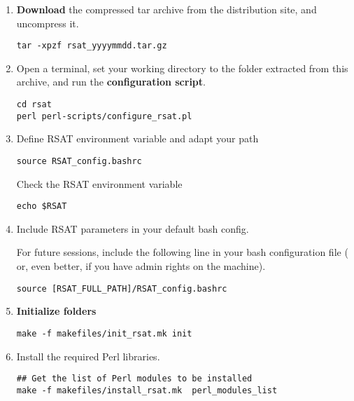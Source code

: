 \documentclass[12pt,a4paper, oneside]{scrreprt} %
\begin{document}
\begin{enumerate}
\item \textbf{Download} the compressed tar archive from the \RSAT
  distribution site, and uncompress it.

  \begin{lstlisting}
tar -xpzf rsat_yyyymmdd.tar.gz
  \end{lstlisting}
  
  
\item Open a terminal, set your working directory to the folder
   extracted from this archive, and run the \RSAT
  \textbf{configuration script}.

  \begin{lstlisting}
cd rsat
perl perl-scripts/configure_rsat.pl
  \end{lstlisting}

\item Define RSAT environment variable and adapt your path

  \begin{lstlisting}
source RSAT_config.bashrc
  \end{lstlisting}


Check the RSAT environment variable

  \begin{lstlisting}
echo $RSAT
  \end{lstlisting}

\item Include RSAT parameters in your default bash config.

For future sessions, include the following line in your bash
configuration file ( or, even better,
 if you have admin rights on the machine).

\begin{verbatim}
source [RSAT_FULL_PATH]/RSAT_config.bashrc
\end{verbatim}


\item \textbf{Initialize \RSAT folders}

  \begin{lstlisting}
make -f makefiles/init_rsat.mk init
  \end{lstlisting}
  
\item Install the required Perl libraries.

  \begin{lstlisting}
## Get the list of Perl modules to be installed
make -f makefiles/install_rsat.mk  perl_modules_list


\end{lstlisting}
\end{enumerate}
\end{document}

